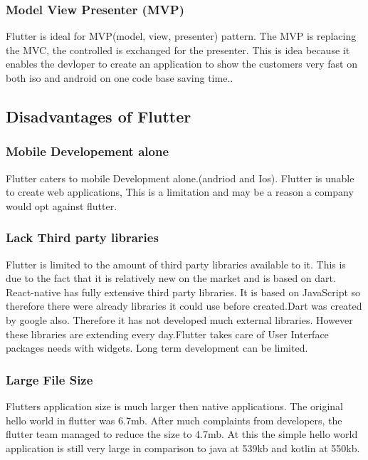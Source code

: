 \subsubsection{Model View Presenter (MVP)}
Flutter is ideal for MVP(model, view, presenter) pattern. The MVP is replacing the MVC, the controlled is exchanged for the presenter. This is idea because it enables the devloper to create an application to show the customers very fast on both iso and android on one code base saving time.\cite{pros_cons}.

\subsection{Disadvantages of Flutter}

\subsubsection{Mobile Developement alone}
Flutter caters to mobile Development alone.(andriod and Ios). Flutter is unable to create web applications, This is a limitation and may be a reason a company would opt against flutter.

\subsubsection{Lack Third party libraries}
Flutter is limited to the amount of third party libraries available to it. This is due to the fact that it is relatively new on the market and is based on dart.\cite{pros_cons} React-native has fully extensive third party libraries. It is based on JavaScript so therefore there were already libraries it could use before created.Dart was created by google also. Therefore it has not developed much external libraries. However these libraries are extending every day.Flutter takes care of User Interface packages needs with widgets. Long term development can be limited.\cite{good_bad}

\subsubsection{Large File Size}
Flutters application size is much larger then native applications. The original hello world in flutter was 6.7mb. After much complaints from developers, the flutter team managed to reduce the size to 4.7mb. At this the simple hello world application is still very large in comparison to java at 539kb and kotlin at 550kb.\cite{faq_2019} \cite{good_bad}



